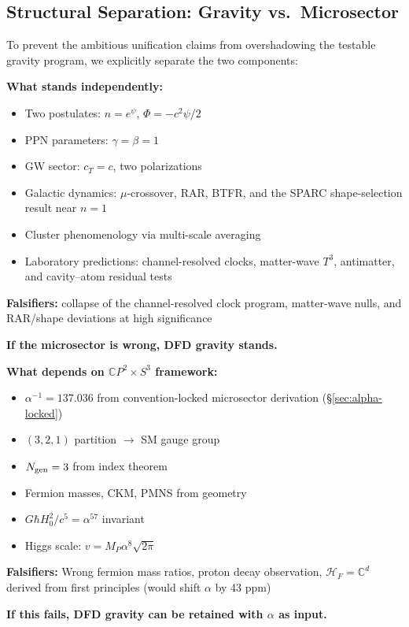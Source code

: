 \subsection{Structural Separation: Gravity vs.\ Microsector}\label{sec:conclusions-separation}

To prevent the ambitious unification claims from overshadowing the testable gravity program, we explicitly separate the two components:

\begin{tcolorbox}[colback=green!5!white, colframe=green!60!black, title=DFD Gravity (Sections I--XII): Robust and Testable]
\textbf{What stands independently:}
\begin{itemize}[nosep]
\item Two postulates: $n = e^\psi$, $\Phi = -c^2\psi/2$
\item PPN parameters: $\gamma = \beta = 1$
\item GW sector: $c_T = c$, two polarizations
\item Galactic dynamics: $\mu$-crossover, RAR, BTFR, and the SPARC shape-selection result near $n=1$
\item Cluster phenomenology via multi-scale averaging
\item Laboratory predictions: channel-resolved clocks, matter-wave $T^3$, antimatter, and cavity--atom residual tests
\end{itemize}
\textbf{Falsifiers:} collapse of the channel-resolved clock program, matter-wave nulls, and RAR/shape deviations at high significance

\textbf{If the microsector is wrong, DFD gravity stands.}
\end{tcolorbox}

\begin{tcolorbox}[colback=yellow!5!white, colframe=yellow!60!black, title=Gauge Emergence (Section XIII): Conditional]
\textbf{What depends on $\mathbb{C}P^2 \times S^3$ framework:}
\begin{itemize}[nosep]
\item $\alpha^{-1} = 137.036$ from convention-locked microsector derivation (\S\ref{sec:alpha-locked})
\item $(3,2,1)$ partition $\to$ SM gauge group
\item $N_{\rm gen} = 3$ from index theorem
\item Fermion masses, CKM, PMNS from geometry
\item $G\hbar H_0^2/c^5 = \alpha^{57}$ invariant
\item Higgs scale: $v = M_P\alpha^8\sqrt{2\pi}$
\end{itemize}
\textbf{Falsifiers:} Wrong fermion mass ratios, proton decay observation, $\mathcal{H}_F = \mathbb{C}^d$ derived from first principles (would shift $\alpha$ by 43 ppm)

\textbf{If this fails, DFD gravity can be retained with $\alpha$ as input.}
\end{tcolorbox}

